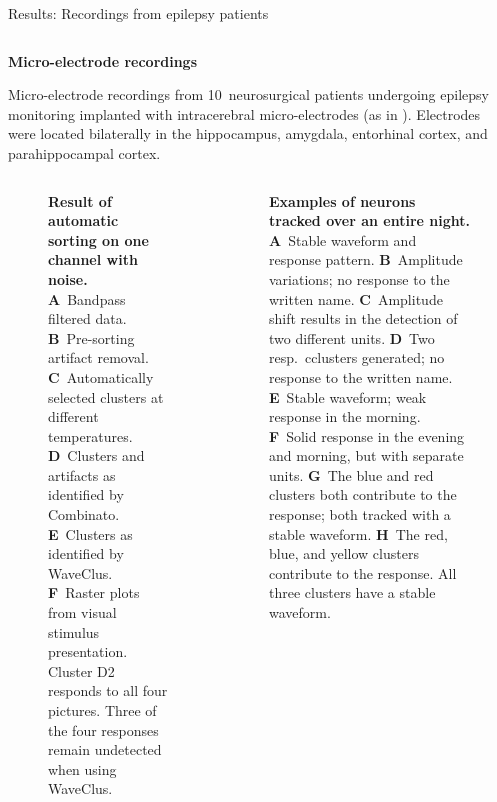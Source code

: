 \documentclass{beamer}
\renewcommand{\emph}{\textbf}
\newenvironment{wideitemize}{\itemize\addtolength{\itemsep}{.2em}\addtolength{\labelsep}{.1ex}}{\enditemize}
\begin{document}
\begin{frame}[t]
\begin{columns}[T]
\begin{column}{.49\linewidth}
\begin{block}{Results: Recordings from epilepsy patients}
\begin{columns}[T]
  \begin{column}{.95\linewidth}
    \vspace{-.5em}
\emph{Micro-electrode recordings}
\begin{wideitemize}
\item Micro-electrode recordings from 10~neurosurgical patients undergoing epilepsy monitoring implanted with intracerebral micro-electrodes (as in \cite{mormann_neurons_2015}).  Electrodes were located bilaterally in the hippocampus, amygdala, entorhinal cortex, and parahippocampal cortex.

\end{wideitemize}

  \begin{columns}[T]
    \begin{column}{.48\linewidth}
\begin{figure}[T]
  \begin{center}
\end{center}
\caption{\emph{Result of automatic sorting on one channel with noise.} \textbf{A}~Bandpass filtered data. \textbf{B}~Pre-sorting artifact removal. \textbf{C}~Automatically selected clusters at different temperatures. \textbf{D}~Clusters and artifacts as identified by Combinato. \textbf{E}~Clusters as identified by WaveClus. \textbf{F}~Raster plots from visual stimulus presentation. Cluster D2 responds to all four pictures. Three of the four responses remain undetected when using WaveClus.}
\end{figure}

\end{column}

\begin{column}{.48\linewidth}
\begin{figure}[T]
  
\caption{\emph{Examples of neurons tracked over an entire night.}
\textbf{A}~Stable waveform and response pattern.
\textbf{B}~Amplitude variations; no response to the written name.
\textbf{C}~Amplitude shift results in the detection of two different units.
\textbf{D}~Two resp.~cclusters generated; no response to the written name.
\textbf{E}~Stable waveform; weak response in the morning.
\textbf{F}~Solid response in the evening and morning, but with separate units. 
\textbf{G}~The blue and red clusters both contribute to the response; both tracked with a stable waveform.
\textbf{H}~The red, blue, and yellow clusters contribute to the response. All three clusters have a stable waveform.
}


\end{figure}
\end{column}
\end{columns}
\end{column}
\end{columns}
\end{block}
\end{column}
\end{columns}
\end{frame}
\end{document}
